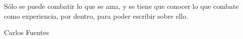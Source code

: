 \begin{dedication}

Sólo se puede combatir lo que se ama, y se tiene que conocer lo que combate como experiencia, por dentro, para poder escribir sobre ello.

Carlos Fuentes
\end{dedication}

